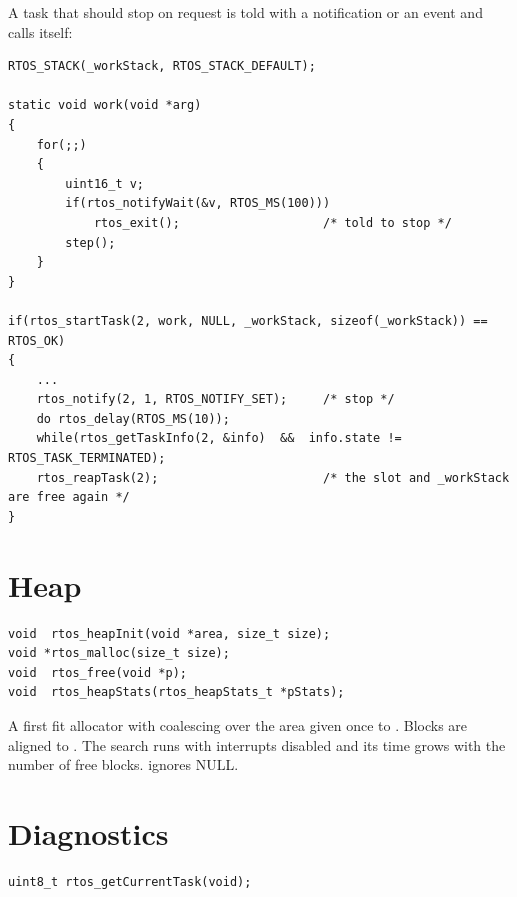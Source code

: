 A task that should stop on request is told with a notification or an event and calls
 itself:
\begin{lstlisting}
RTOS_STACK(_workStack, RTOS_STACK_DEFAULT);

static void work(void *arg)
{
    for(;;)
    {
        uint16_t v;
        if(rtos_notifyWait(&v, RTOS_MS(100)))
            rtos_exit();                    /* told to stop */
        step();
    }
}

if(rtos_startTask(2, work, NULL, _workStack, sizeof(_workStack)) == RTOS_OK)
{
    ...
    rtos_notify(2, 1, RTOS_NOTIFY_SET);     /* stop */
    do rtos_delay(RTOS_MS(10));
    while(rtos_getTaskInfo(2, &info)  &&  info.state != RTOS_TASK_TERMINATED);
    rtos_reapTask(2);                       /* the slot and _workStack are free again */
}
\end{lstlisting}

\section{Heap}

\begin{lstlisting}
void  rtos_heapInit(void *area, size_t size);
void *rtos_malloc(size_t size);
void  rtos_free(void *p);
void  rtos_heapStats(rtos_heapStats_t *pStats);
\end{lstlisting}
A first fit allocator with coalescing over the area given once to .
Blocks are aligned to . The search runs with interrupts
disabled and its time grows with the number of free blocks.  ignores
NULL.

\section{Diagnostics}

\begin{lstlisting}
uint8_t rtos_getCurrentTask(void);
\end{lstlisting}

